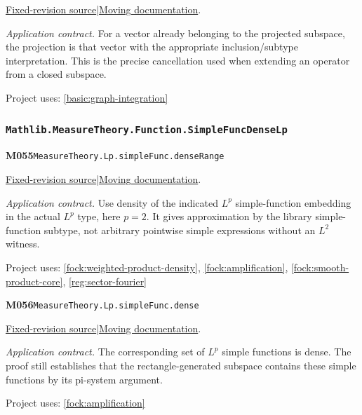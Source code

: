 \documentclass[11pt,a4paper]{article}
\theoremstyle{definition}
\theoremstyle{remark}
\begin{document}
\href{https://github.com/leanprover-community/mathlib4/blob/9bac2d0692944a775113f7c130fd5e5b4608a854/Mathlib/Analysis/InnerProductSpace/Projection/Basic.lean}{Fixed-revision source}\quad|\quad\href{https://leanprover-community.github.io/mathlib4_docs/Mathlib/Analysis/InnerProductSpace/Projection/Basic.html#Submodule.orthogonalProjectionOnto_mem_subspace_eq_self}{Moving documentation}.\par
\noindent\textit{Application contract.} For a vector already belonging to the projected subspace, the projection is that vector with the appropriate inclusion/subtype interpretation. This is the precise cancellation used when extending an operator from a closed subspace.\par
{\small Project uses: \ref{basic:graph-integration}}\par\medskip

\subsubsection*{\nolinkurl{Mathlib.MeasureTheory.Function.SimpleFuncDenseLp}}
\noindent\textbf{M055}\label{base:M055}\quad\nolinkurl{MeasureTheory.Lp.simpleFunc.denseRange}

\href{https://github.com/leanprover-community/mathlib4/blob/9bac2d0692944a775113f7c130fd5e5b4608a854/Mathlib/MeasureTheory/Function/SimpleFuncDenseLp.lean}{Fixed-revision source}\quad|\quad\href{https://leanprover-community.github.io/mathlib4_docs/Mathlib/MeasureTheory/Function/SimpleFuncDenseLp.html#MeasureTheory.Lp.simpleFunc.denseRange}{Moving documentation}.\par
\noindent\textit{Application contract.} Use density of the indicated $L^p$ simple-function embedding in the actual $L^p$ type, here $p=2$. It gives approximation by the library simple-function subtype, not arbitrary pointwise simple expressions without an $L^2$ witness.\par
{\small Project uses: \ref{fock:weighted-product-density}, \ref{fock:amplification}, \ref{fock:smooth-product-core}, \ref{reg:sector-fourier}}\par\medskip

\noindent\textbf{M056}\label{base:M056}\quad\nolinkurl{MeasureTheory.Lp.simpleFunc.dense}

\href{https://github.com/leanprover-community/mathlib4/blob/9bac2d0692944a775113f7c130fd5e5b4608a854/Mathlib/MeasureTheory/Function/SimpleFuncDenseLp.lean}{Fixed-revision source}\quad|\quad\href{https://leanprover-community.github.io/mathlib4_docs/Mathlib/MeasureTheory/Function/SimpleFuncDenseLp.html#MeasureTheory.Lp.simpleFunc.dense}{Moving documentation}.\par
\noindent\textit{Application contract.} The corresponding set of $L^p$ simple functions is dense. The proof still establishes that the rectangle-generated subspace contains these simple functions by its pi-system argument.\par
{\small Project uses: \ref{fock:amplification}}\par\medskip
\end{document}
